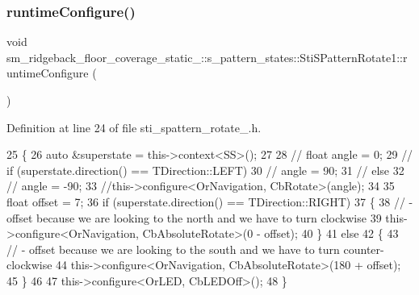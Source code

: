 \subsubsection{\texorpdfstring{runtime\+Configure()}{runtimeConfigure()}}
{\footnotesize\ttfamily void sm\+\_\+ridgeback\+\_\+floor\+\_\+coverage\+\_\+static\+\_\+::s\+\_\+pattern\+\_\+states\+::\+Sti\+S\+Pattern\+Rotate1\+::runtime\+Configure (\begin{DoxyParamCaption}{ }\end{DoxyParamCaption})\hspace{0.3cm}{\ttfamily [inline]}}



Definition at line 24 of file sti\+\_\+spattern\+\_\+rotate\+\_.\+h.


\begin{DoxyCode}
25     \{
26         \textcolor{keyword}{auto} &superstate = this->context<SS>();
27 
28         \textcolor{comment}{// float angle = 0;}
29         \textcolor{comment}{// if (superstate.direction() == TDirection::LEFT)}
30         \textcolor{comment}{//     angle = 90;}
31         \textcolor{comment}{// else}
32         \textcolor{comment}{//     angle = -90;}
33         \textcolor{comment}{//this->configure<OrNavigation, CbRotate>(angle);}
34 
35         \textcolor{keywordtype}{float} offset = 7;
36         \textcolor{keywordflow}{if} (superstate.direction() == TDirection::RIGHT)
37         \{
38             \textcolor{comment}{// - offset because we are looking to the north and we have to turn clockwise}
39             this->configure<OrNavigation, CbAbsoluteRotate>(0 - offset);
40         \}
41         \textcolor{keywordflow}{else}
42         \{
43             \textcolor{comment}{// - offset because we are looking to the south and we have to turn counter-clockwise}
44             this->configure<OrNavigation, CbAbsoluteRotate>(180 + offset);
45         \}
46 
47         this->configure<OrLED, CbLEDOff>();
48     \}
\end{DoxyCode}
\mbox{\label{structsm__ridgeback__floor__coverage__static__1_1_1s__pattern__states_1_1StiSPatternRotate1_a973c76d2b8be9f4cf866688a68473ec5}} 
